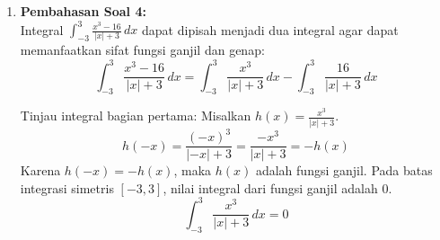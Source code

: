 \documentclass[11pt,openany,a4paper]{article}
\begin{document}
\begin{enumerate}
        Luas daerah gambar $L(x)$ dirumuskan sebagai:
        \[
          L(x) = l_g \cdot t_g = (x - 8) \left( \frac{360}{x} - 12 \right) = 360 - 12x - \frac{2880}{x} + 96 = 456 - 12x - 2880x^{-1}
        \]
        Untuk mencari luas maksimum, cari nilai kritis dengan menggunakan turunan pertama $L'(x)$:
        \[
          L'(x) = -12 + 2880x^{-2} = \frac{2880}{x^2} - 12
        \]
        Untuk menemukan titik stasioner, kita mengatur $L'(x) = 0$:
        \[
          \frac{2880}{x^2} = 12 \implies x^2 = \frac{2880}{12} = 240 \implies x = \sqrt{240} = 4\sqrt{15} \approx 15.49
        \]
        Titik kritis $x \approx 15.49$ berada di luar domain $20 \le x < 30$. \\
        Untuk interval $x \ge 20$, nilai $x^2 \ge 400$, sehingga $\frac{2880}{x^2} \le 7.2$. \\
        Karena itu, $L'(x) = \frac{2880}{x^2} - 12 \le 7.2 - 12 = -4.8 < 0$ untuk setiap $x \in [20, 30)$. \\
        Karena turunan pertamanya negatif ($L'(x) < 0$), fungsi $L(x)$ monoton turun pada interval $20 \le x < 30$. \\
        Karena fungsi monoton turun, nilai maksimum fungsi pada interval dicapai pada batas sekecil-kecilnya dari interval, yaitu di $x = 20$. \\
        Saat $x = 20$, luas daerah gambar maksimum adalah:
        \[
          L(20) = 456 - 12(20) - \frac{2880}{20} = 456 - 240 - 144 = 72 \text{ cm}^2
        \]
        Jadi, luas daerah gambar agar luasnya maksimum adalah $72 \text{ cm}^2$.

  \item \textbf{Pembahasan Soal 4:} \\
        Integral $\int_{-3}^{3} \frac{x^3 - 16}{|x| + 3} \, dx$ dapat dipisah menjadi dua integral agar dapat memanfaatkan sifat fungsi ganjil dan genap:
        \[
          \int_{-3}^{3} \frac{x^3 - 16}{|x| + 3} \, dx = \int_{-3}^{3} \frac{x^3}{|x| + 3} \, dx - \int_{-3}^{3} \frac{16}{|x| + 3} \, dx
        \]
        
        Tinjau integral bagian pertama:
        Misalkan $h(x) = \frac{x^3}{|x| + 3}$.
        \[
          h(-x) = \frac{(-x)^3}{|-x| + 3} = \frac{-x^3}{|x| + 3} = -h(x)
        \]
        Karena $h(-x) = -h(x)$, maka $h(x)$ adalah fungsi ganjil. Pada batas integrasi simetris $[-3, 3]$, nilai integral dari fungsi ganjil adalah $0$.
        \[
          \int_{-3}^{3} \frac{x^3}{|x| + 3} \, dx = 0
        \]
        

\end{enumerate}
\end{document}

